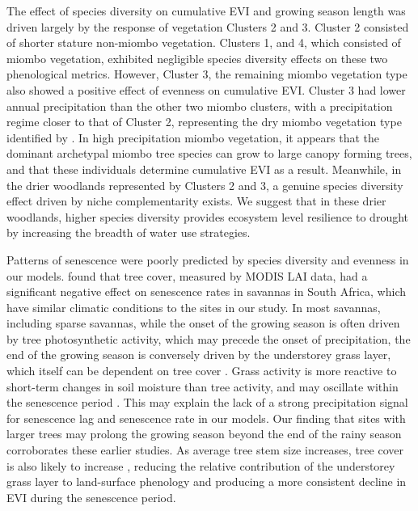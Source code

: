 \begin{refsection}
The effect of species diversity on cumulative EVI and growing season length was driven largely by the response of vegetation Clusters 2 and 3. Cluster 2 consisted of shorter stature non-miombo vegetation. Clusters 1, and 4, which consisted of miombo vegetation, exhibited negligible species diversity effects on these two phenological metrics. However, Cluster 3, the remaining miombo vegetation type also showed a positive effect of evenness on cumulative EVI. Cluster 3 had lower annual precipitation than the other two miombo clusters, with a precipitation regime closer to that of Cluster 2, representing the dry miombo vegetation type identified by \citet{White1983}. In high precipitation miombo vegetation, it appears that the dominant archetypal miombo tree species can grow to large canopy forming trees, and that these individuals determine cumulative EVI as a result. Meanwhile, in the drier woodlands represented by Clusters 2 and 3, a genuine species diversity effect driven by niche complementarity exists. We suggest that in these drier woodlands, higher species diversity provides ecosystem level resilience to drought by increasing the breadth of water use strategies. 

Patterns of senescence were poorly predicted by species diversity and evenness in our models. \citet{Cho2017} found that tree cover, measured by MODIS LAI data, had a significant negative effect on senescence rates in savannas in South Africa, which have similar climatic conditions to the sites in our study. In most savannas, including sparse savannas, while the onset of the growing season is often driven by tree photosynthetic activity, which may precede the onset of precipitation, the end of the growing season is conversely driven by the understorey grass layer, which itself can be dependent on tree cover \citep{Cho2017, Guan2014}. Grass activity is more reactive to short-term changes in soil moisture than tree activity, and may oscillate within the senescence period \citep{Archibald2007}. This may explain the lack of a strong precipitation signal for senescence lag and senescence rate in our models. Our finding that sites with larger trees may prolong the growing season beyond the end of the rainy season corroborates these earlier studies. As average tree stem size increases, tree cover is also likely to increase \citep{Panzou2020}, reducing the relative contribution of the understorey grass layer to land-surface phenology and producing a more consistent decline in EVI during the senescence period. 


\end{refsection}
